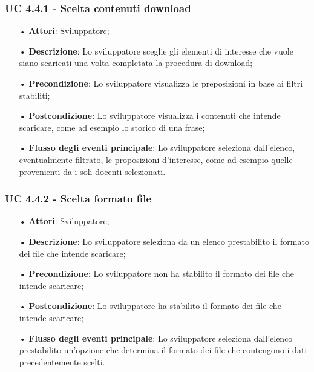 \subsubsection{UC 4.4.1 - Scelta contenuti download}
\begin{itemize}
\item[•]\textbf{Attori}: Sviluppatore;
\item[•]\textbf{Descrizione}: Lo sviluppatore sceglie gli elementi di interesse che vuole siano scaricati una volta completata la procedura di download;
\item[•]\textbf{Precondizione}: Lo sviluppatore visualizza le preposizioni in base ai filtri stabiliti;
\item[•]\textbf{Postcondizione}:  Lo sviluppatore visualizza i contenuti che intende scaricare, come ad esempio lo storico di una frase;
\item[•]\textbf{Flusso degli eventi principale}:  Lo sviluppatore seleziona dall'elenco, eventualmente filtrato, le proposizioni d'interesse, come ad esempio quelle provenienti da i soli docenti selezionati.
\end{itemize}

\subsubsection{UC 4.4.2 - Scelta formato file}
\begin{itemize}
\item[•]\textbf{Attori}: Sviluppatore;
\item[•]\textbf{Descrizione}:  Lo sviluppatore seleziona da un elenco prestabilito il formato dei file che intende scaricare;
\item[•]\textbf{Precondizione}: Lo sviluppatore non ha stabilito il formato dei file che intende scaricare;
\item[•]\textbf{Postcondizione}:  Lo sviluppatore ha stabilito il formato dei file che intende scaricare;
\item[•]\textbf{Flusso degli eventi principale}:  Lo sviluppatore seleziona dall'elenco prestabilito un'opzione che determina il formato dei file che contengono i dati precedentemente scelti.
\end{itemize}

